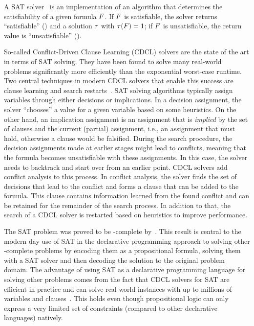 A SAT solver~\autocite{handbook2-cdcl} is an implementation of an algorithm that determines the satisfiability of a given formula $F$.
If $F$ is satisfiable, the solver returns ``satisfiable'' (\sat{}) and a solution $\tau$ with $\tau(F)=1$;
if $F$ is unsatisfiable, the return value is ``unsatisfiable'' (\unsat{}).

So-called Conflict-Driven Clause Learning (CDCL) solvers are the state of the art in terms of SAT solving.
They have been found to solve many real-world problems significantly more efficiently than the exponential worst-case runtime.
Two central techniques in modern CDCL solvers that enable this success are clause learning and search restarts~\autocite{handbook2-cdcl}.
SAT solving algorithms typically assign variables through either decisions or implications.
In a decision assignment, the solver ``chooses'' a value for a given variable based on some heuristics.
On the other hand, an implication assignment is an assignment that is \emph{implied} by the set of clauses and the current (partial) assignment, i.e., an assignment that must hold, otherwise a clause would be falsified.
During the search procedure, the decision assignments made at earlier stages might lead to conflicts, meaning that the formula becomes unsatisfiable with these assignments.
In this case, the solver needs to backtrack and start over from an earlier point.
CDCL solvers add conflict analysis to this process.
In conflict analysis, the solver finds the set of decisions that lead to the conflict and forms a clause that can be added to the formula.
This clause contains information learned from the found conflict and can be retained for the remainder of the search process.
In addition to that, the search of a CDCL solver is restarted based on heuristics to improve performance.

The SAT problem was proved to be \NP-complete by~\textcite{DBLP:conf/stoc/Cook71}.
This result is central to the modern day use of SAT in the declarative programming approach to solving other \NP-complete problems by encoding them as a propositional formula, solving them with a SAT solver and then decoding the solution to the original problem domain.
The advantage of using SAT as a declarative programming language for solving other problems comes from the fact that CDCL solvers for SAT are efficient in practice and can solve real-world instances with up to millions of variables and clauses~\autocite{handbook2-cdcl}.
This holds even though propositional logic can only express a very limited set of constraints (compared to other declarative languages) natively.

